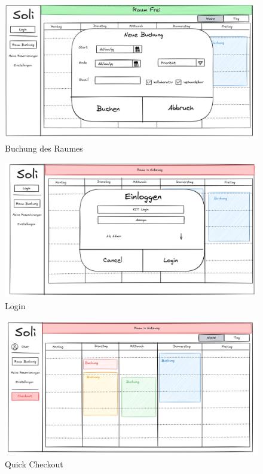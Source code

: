\begin{figure}[ht]
    \centering
    \includegraphics[scale=0.15]{figures/booking.png}
    \caption{Buchung des Raumes}
    \label{fig:buchung}
\end{figure}

\begin{figure}[ht]
    \centering
    \includegraphics[scale=0.15]{figures/login.png}
    \caption{Login}
    \label{fig:login}
\end{figure}

\begin{figure}[ht]
    \centering
    \includegraphics[scale=0.15]{figures/checkout.png}
    \caption{Quick Checkout}
    \label{fig:checkout}
\end{figure}
\pagebreak


